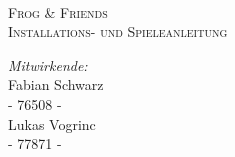 \documentclass[
11pt, %
oneside, %
ngerman, %
singlespacing, %
headsepline, %
]{MastersDoctoralThesis} %
\begin{document}
\frontmatter %

\pagestyle{plain} %


\begin{titlepage}
\begin{center}

\vspace*{.08\textheight}

\HRule \\[0.6cm] %
\textsc{\Large Frog \& Friends}\\[0.5cm]
\textsc{\huge Installations- und Spieleanleitung}\vspace{0.4cm}
\HRule \\[1.5cm] %
 
\vfill

\emph{Mitwirkende:}\\[0.3cm]
{Fabian Schwarz}\\ %
{- 76508 -}\\[0.2cm]
{Lukas Vogrinc}\\
{- 77871 -}
 

\end{center}
\end{titlepage}
\end{document}
